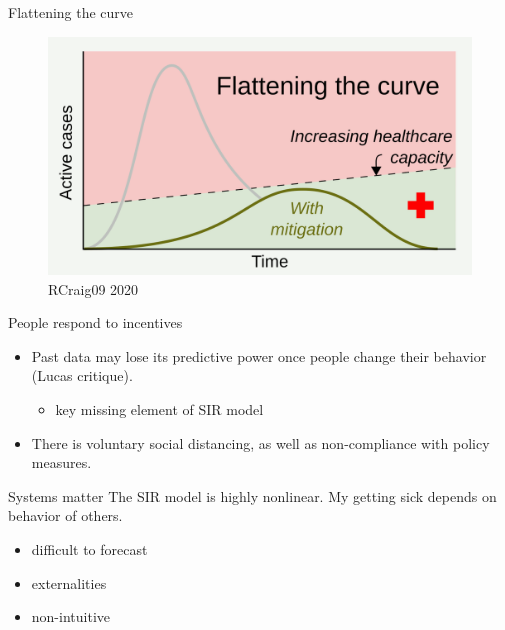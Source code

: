 \documentclass[
  ignorenonframetext,
  aspectratio=54,
]{beamer}
\providecommand{\tightlist}{%
  \setlength{\itemsep}{0pt}\setlength{\parskip}{0pt}}
\begin{document}
\begin{frame}{Flattening the curve}
\protect\hypertarget{flattening-the-curve-1}{}
\begin{figure}
\centering
\includegraphics{exhibit/fig/flatten2.png}
\caption{RCraig09 2020}
\end{figure}
\end{frame}

\begin{frame}{People respond to incentives}
\protect\hypertarget{people-respond-to-incentives}{}
\begin{itemize}
\tightlist
\item
  Past data may lose its predictive power once people change their
  behavior (Lucas critique).

  \begin{itemize}
  \tightlist
  \item
    key missing element of SIR model
  \end{itemize}
\item
  There is voluntary social distancing, as well as non-compliance with
  policy measures.
\end{itemize}
\end{frame}

\begin{frame}{Systems matter}
\protect\hypertarget{systems-matter}{}
The SIR model is highly nonlinear. My getting sick depends on behavior
of others.

\begin{itemize}
\tightlist
\item
  difficult to forecast
\item
  externalities
\item
  non-intuitive
\end{itemize}
\end{frame}
\end{document}
